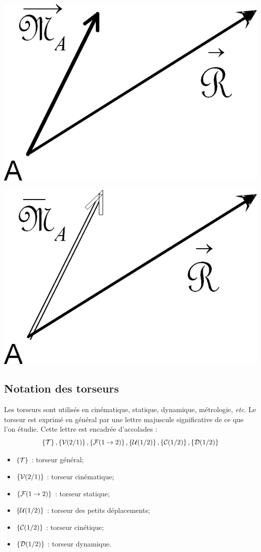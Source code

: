 \documentclass[10pt,oneside]{article}
\begin{document}
\begin{minipage}[c]{.47\linewidth}
\begin{center}
\includegraphics[width=.55\textwidth]{png/fig_1}
\end{center}
\end{minipage} \hfill
\begin{minipage}[c]{.47\linewidth}
\begin{center}
\includegraphics[width=.55\textwidth]{png/fig_02}
\end{center}
\end{minipage}

\subsection{Notation des torseurs}
Les torseurs sont utilisés en cinématique, statique, dynamique, métrologie, \textit{etc}. Le torseur est exprimé en général par une lettre majuscule significative de ce que l'on étudie. Cette lettre est encadrée d'accolades :
$$
\left\{{\mathcal{T}}\right\}, \left\{{\mathcal{V}(2/1)}\right\}, \left\{{\mathcal{F}(1\rightarrow 2)}\right\}, \left\{{\mathcal{U}(1/2)}\right\}, \left\{{\mathcal{C}(1/2)}\right\}, \left\{{\mathcal{D}(1/2)}\right\}
$$

\begin{itemize}
\item $\left\{{\mathcal{T}}\right\}$ : torseur général;
\item $\left\{{\mathcal{V}(2/1)}\right\}$ : torseur cinématique;
\item $\left\{{\mathcal{F}(1\rightarrow 2)}\right\}$ : torseur statique;
\item $\left\{{\mathcal{U}(1/2)}\right\}$ : torseur des petits déplacements;
\item $\left\{{\mathcal{C}(1/2)}\right\}$ : torseur cinétique;
\item $\left\{{\mathcal{D}(1/2)}\right\}$ : torseur dynamique.
\end{itemize}
\end{document}
